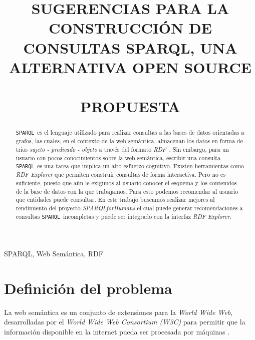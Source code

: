 \documentclass[conference,compsoc]{IEEEtran}
\newcommand{\rdf}{\textit{RDF}\ } \newcommand{\spql}{\texttt{SPARQL}\ }
\begin{document}
\title{SUGERENCIAS PARA LA CONSTRUCCIÓN DE CONSULTAS SPARQL, UNA ALTERNATIVA OPEN SOURCE\\ \ \\PROPUESTA}

\author{
    }

\maketitle

\IEEEpubidadjcol

\begin{abstract}
    \spql es el lenguaje utilizado para realizar consultas a las bases de datos
    orientadas a grafos, las cuales, en el contexto de la web semántica,
    almacenan los datos en forma de tríos \textit{sujeto - predicado - objeto} a
    través del formato \rdf. Sin embargo, para un usuario con pocos
    conocimientos sobre la web semántica, escribir una consulta \spql es una
    tarea que implica un alto esfuerzo cognitivo. Existen herramientas como
    \textit{RDF Explorer} que permiten construir consultas de forma interactiva.
    Pero no es suficiente, puesto que aún le exigimos al usuario conocer el
    esquema y los contenidos de la base de datos con la que trabajamos. Para
    esto podemos recomendar al usuario que entidades puede consultar. En este
    trabajo buscamos realizar mejores al rendimiento del proyecto
    \textit{SPARQLforHumans} el cual puede generar recomendaciones a consultas
    \spql incompletas y puede ser integrado con la interfaz \textit{RDF
    Explorer}.
\end{abstract}

\begin{IEEEkeywords}
    SPARQL, Web Semántica, RDF
\end{IEEEkeywords}

\IEEEpeerreviewmaketitle

\section{Definición del problema}

La web semántica es un conjunto de extensiones para la \textit{World Wide Web},
desarrolladas por el \textit{World Wide Web Consortium (W3C)} para permitir que
la información disponible en la internet pueda ser procesada por máquinas
\cite{berners2001semantic}.
\end{document}
